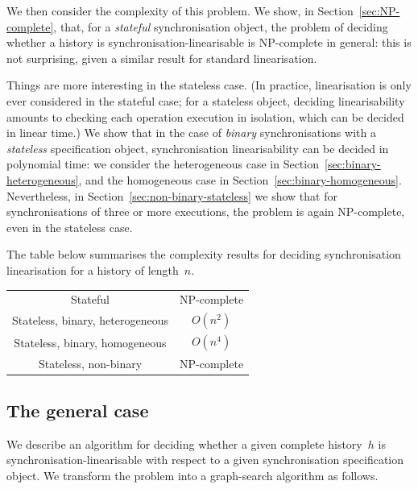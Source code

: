 We then consider the complexity of this problem.  We show, in
Section~\ref{sec:NP-complete}, that, for a \emph{stateful} synchronisation
object, the problem of deciding whether a history is
synchronisation-linearisable is NP-complete in general: this is not
surprising, given a similar result for standard linearisation.

Things are more interesting in the stateless case.  (In practice,
linearisation is only ever considered in the stateful case; for a stateless
object, deciding linearisability amounts to checking each operation execution
in isolation, which can be decided in linear time.)  We show that in the case
of \emph{binary} synchronisations with a \emph{stateless} specification
object, synchronisation linearisability can be decided in polynomial time: we
consider the heterogeneous case in Section~\ref{sec:binary-heterogeneous}, and
the homogeneous case in Section~\ref{sec:binary-homogeneous}.  Nevertheless,
in Section~\ref{sec:non-binary-stateless} we show that for synchronisations of
three or more executions, the problem is again NP-complete, even in the
stateless case.

The table below summarises the complexity results for deciding synchronisation
linearisation for a history of length~$n$.
% 
\begin{center}
\begin{tabular}{cc}
Stateful & NP-complete \\
Stateless, binary, heterogeneous & $O(n^2)$ \\
Stateless, binary, homogeneous & $O(n^4)$ \\
Stateless, non-binary & NP-complete
\end{tabular}
\end{center}



\subsection{The general case}
\label{sec:algorithm-dfs}

We describe an algorithm for deciding whether a given complete history~$h$ is
synchronisation-linearisable with respect to a given synchronisation
specification object.  We transform the problem into a graph-search algorithm
as follows.

